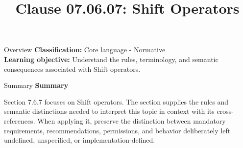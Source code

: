 \documentclass[10pt,letterpaper]{article}
\title{Clause 07.06.07: Shift Operators}
\author{}
\date{}
\begin{document}
\maketitle
\begin{CornellOverviewBox}{Overview}
\textbf{Classification:} Core language - Normative\\[2pt]
\textbf{Learning objective:} Understand the rules, terminology, and semantic consequences associated with Shift operators.
\end{CornellOverviewBox}\begin{CornellSummaryBox}{Summary}
{\sffamily\bfseries\color{Accent} Summary}\par\vspace{3pt}Section 7.6.7 focuses on Shift operators. The section supplies the rules and semantic distinctions needed to interpret this topic in context with its cross-references. When applying it, preserve the distinction between mandatory requirements, recommendations, permissions, and behavior deliberately left undefined, unspecified, or implementation-defined.
\end{CornellSummaryBox}
\end{document}
